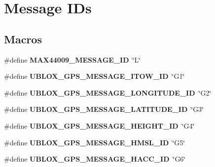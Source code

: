 \hypertarget{group___lo_ra}{}\section{Message I\+Ds}
\label{group___lo_ra}
\subsection*{Macros}
\begin{DoxyCompactItemize}
\item 
\hypertarget{group___lo_ra_gab6d13d9f4498c3377c819dbf95e334af}{}\#define {\bfseries M\+A\+X44009\+\_\+\+M\+E\+S\+S\+A\+G\+E\+\_\+\+I\+D}~\char`\"{}L\char`\"{}\label{group___lo_ra_gab6d13d9f4498c3377c819dbf95e334af}

\item 
\hypertarget{group___lo_ra_ga0672c8789cee392329f0674212cf0363}{}\#define {\bfseries U\+B\+L\+O\+X\+\_\+\+G\+P\+S\+\_\+\+M\+E\+S\+S\+A\+G\+E\+\_\+\+I\+T\+O\+W\+\_\+\+I\+D}~\char`\"{}G1\char`\"{}\label{group___lo_ra_ga0672c8789cee392329f0674212cf0363}

\item 
\hypertarget{group___lo_ra_gacf092cbc2203d795721d248c577ac9be}{}\#define {\bfseries U\+B\+L\+O\+X\+\_\+\+G\+P\+S\+\_\+\+M\+E\+S\+S\+A\+G\+E\+\_\+\+L\+O\+N\+G\+I\+T\+U\+D\+E\+\_\+\+I\+D}~\char`\"{}G2\char`\"{}\label{group___lo_ra_gacf092cbc2203d795721d248c577ac9be}

\item 
\hypertarget{group___lo_ra_ga057c4d64bacffa60cafa920ba6e20bf8}{}\#define {\bfseries U\+B\+L\+O\+X\+\_\+\+G\+P\+S\+\_\+\+M\+E\+S\+S\+A\+G\+E\+\_\+\+L\+A\+T\+I\+T\+U\+D\+E\+\_\+\+I\+D}~\char`\"{}G3\char`\"{}\label{group___lo_ra_ga057c4d64bacffa60cafa920ba6e20bf8}

\item 
\hypertarget{group___lo_ra_ga89afb27a6fc3cfce21a2ca5671a439a8}{}\#define {\bfseries U\+B\+L\+O\+X\+\_\+\+G\+P\+S\+\_\+\+M\+E\+S\+S\+A\+G\+E\+\_\+\+H\+E\+I\+G\+H\+T\+\_\+\+I\+D}~\char`\"{}G4\char`\"{}\label{group___lo_ra_ga89afb27a6fc3cfce21a2ca5671a439a8}

\item 
\hypertarget{group___lo_ra_ga09885c80a06127b63680d4b1169cd5b2}{}\#define {\bfseries U\+B\+L\+O\+X\+\_\+\+G\+P\+S\+\_\+\+M\+E\+S\+S\+A\+G\+E\+\_\+\+H\+M\+S\+L\+\_\+\+I\+D}~\char`\"{}G5\char`\"{}\label{group___lo_ra_ga09885c80a06127b63680d4b1169cd5b2}

\item 
\hypertarget{group___lo_ra_ga2bf969c4bc388fd5148384592932f517}{}\#define {\bfseries U\+B\+L\+O\+X\+\_\+\+G\+P\+S\+\_\+\+M\+E\+S\+S\+A\+G\+E\+\_\+\+H\+A\+C\+C\+\_\+\+I\+D}~\char`\"{}G6\char`\"{}\label{group___lo_ra_ga2bf969c4bc388fd5148384592932f517}


\end{DoxyCompactItemize}
